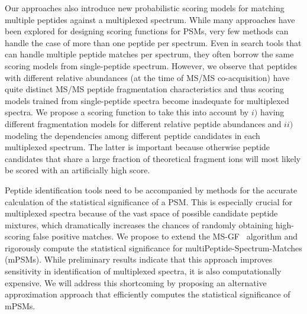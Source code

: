 \documentclass[arial,11pt]{article}
\begin{document}
Our approaches also introduce new probabilistic scoring models for matching multiple peptides against a multiplexed  spectrum.  While many approaches have been explored for designing scoring functions for PSMs, very few methods can handle the case of more than one peptide per spectrum. Even in search tools that can handle multiple peptide matches per spectrum, they often borrow the same scoring models from single-peptide spectrum. However, we observe that peptides with different relative abundances (at the time of MS/MS co-acquisition) have quite distinct MS/MS peptide fragmentation characteristics and thus scoring models trained from single-peptide spectra become inadequate  for multiplexed spectra. We propose a scoring function to take this into account by $i)$ having different fragmentation models for different relative peptide abundances and $ii)$ modeling the dependencies among different peptide candidates in each multiplexed spectrum.  The latter is important because otherwise peptide candidates that share a large fraction of theoretical fragment ions will most likely be scored with an artificially high score.

Peptide identification tools need to be accompanied by methods for the accurate calculation of the statistical significance of a PSM.  This is especially crucial for multiplexed spectra because of the  vast space of possible candidate peptide mixtures, which dramatically increases the chances of randomly obtaining high-scoring false positive matches.  We propose to extend the MS-GF~\cite{kim2008spectral} algorithm and rigorously compute the statistical significance for multiPeptide-Spectrum-Matches (mPSMs).  While preliminary results indicate that this approach improves sensitivity in identification of multiplexed spectra, it is also computationally expensive. We will address this shortcoming by proposing an alternative approximation approach that efficiently computes the statistical significance of mPSMs.

\end{document}
